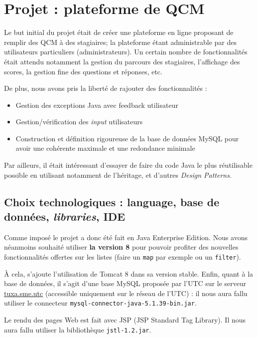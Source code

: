 \chapter{Projet : plateforme de QCM}

Le but initial du projet était de créer une plateforme en ligne proposant de remplir des QCM à des stagiaires; la plateforme étant administrable par des utilisateurs particuliers (administrateurs). Un certain nombre de fonctionnalités était attendu notamment la gestion du parcours des stagiaires, l'affichage des scores, la gestion fine des questions et réponses, etc.

\medskip

\noindent De plus, nous avons pris la liberté de rajouter des fonctionnalités :
\begin{itemize}
  \item Gestion des exceptions Java avec feedback utilisateur
  \item Gestion/vérification des \textit{input} utilisateurs
  \item Construction et définition rigoureuse de la base de données MySQL pour avoir une cohérente maximale et une redondance minimale
\end{itemize}

Par ailleurs, il était intéressant d'essayer de faire du code Java le plus réutilisable possible en utilisant notamment de l'héritage, et d'autres \textit{Design Patterns}.

\section{Choix technologiques : language, base de données, \textit{libraries}, IDE}

Comme imposé le projet a donc été fait en Java Enterprise Edition. Nous avons néanmoins souhaité utiliser \textbf{la version 8} pour pouvoir profiter des nouvelles fonctionnalités offertes sur les listes (faire un \lstinline{map} par exemple ou un \lstinline{filter}).

\medskip

À cela, s'ajoute l'utilisation de Tomcat 8 dans sa version stable. Enfin, quant à la base de données, il s'agit d'une base MySQL proposée par l'UTC sur le serveur \url{tuxa.sme.utc} (accessible uniquement sur le réseau de l'UTC) : il nous aura fallu utiliser le connecteur \lstinline{mysql-connector-java-5.1.39-bin.jar}.

\medskip

Le rendu des pages Web est fait avec JSP (JSP Standard Tag Library). Il nous aura fallu utiliser la bibliothèque \lstinline{jstl-1.2.jar}.

